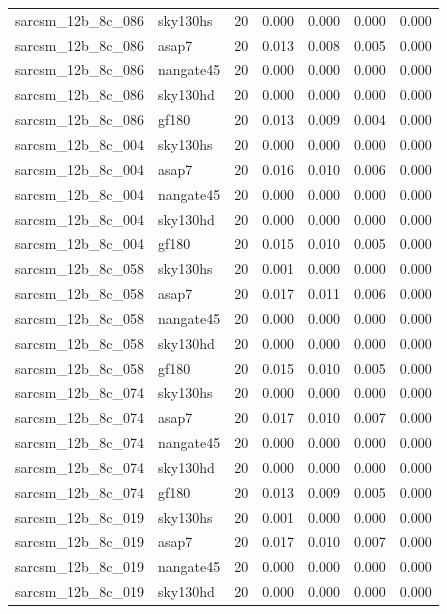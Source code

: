 \begin{tabular}{llrrrrr}
sarcsm\_12b\_8c\_086 & sky130hs & 20 & 0.000 & 0.000 & 0.000 & 0.000 \\
sarcsm\_12b\_8c\_086 & asap7 & 20 & 0.013 & 0.008 & 0.005 & 0.000 \\
sarcsm\_12b\_8c\_086 & nangate45 & 20 & 0.000 & 0.000 & 0.000 & 0.000 \\
sarcsm\_12b\_8c\_086 & sky130hd & 20 & 0.000 & 0.000 & 0.000 & 0.000 \\
sarcsm\_12b\_8c\_086 & gf180 & 20 & 0.013 & 0.009 & 0.004 & 0.000 \\
sarcsm\_12b\_8c\_004 & sky130hs & 20 & 0.000 & 0.000 & 0.000 & 0.000 \\
sarcsm\_12b\_8c\_004 & asap7 & 20 & 0.016 & 0.010 & 0.006 & 0.000 \\
sarcsm\_12b\_8c\_004 & nangate45 & 20 & 0.000 & 0.000 & 0.000 & 0.000 \\
sarcsm\_12b\_8c\_004 & sky130hd & 20 & 0.000 & 0.000 & 0.000 & 0.000 \\
sarcsm\_12b\_8c\_004 & gf180 & 20 & 0.015 & 0.010 & 0.005 & 0.000 \\
sarcsm\_12b\_8c\_058 & sky130hs & 20 & 0.001 & 0.000 & 0.000 & 0.000 \\
sarcsm\_12b\_8c\_058 & asap7 & 20 & 0.017 & 0.011 & 0.006 & 0.000 \\
sarcsm\_12b\_8c\_058 & nangate45 & 20 & 0.000 & 0.000 & 0.000 & 0.000 \\
sarcsm\_12b\_8c\_058 & sky130hd & 20 & 0.000 & 0.000 & 0.000 & 0.000 \\
sarcsm\_12b\_8c\_058 & gf180 & 20 & 0.015 & 0.010 & 0.005 & 0.000 \\
sarcsm\_12b\_8c\_074 & sky130hs & 20 & 0.000 & 0.000 & 0.000 & 0.000 \\
sarcsm\_12b\_8c\_074 & asap7 & 20 & 0.017 & 0.010 & 0.007 & 0.000 \\
sarcsm\_12b\_8c\_074 & nangate45 & 20 & 0.000 & 0.000 & 0.000 & 0.000 \\
sarcsm\_12b\_8c\_074 & sky130hd & 20 & 0.000 & 0.000 & 0.000 & 0.000 \\
sarcsm\_12b\_8c\_074 & gf180 & 20 & 0.013 & 0.009 & 0.005 & 0.000 \\
sarcsm\_12b\_8c\_019 & sky130hs & 20 & 0.001 & 0.000 & 0.000 & 0.000 \\
sarcsm\_12b\_8c\_019 & asap7 & 20 & 0.017 & 0.010 & 0.007 & 0.000 \\
sarcsm\_12b\_8c\_019 & nangate45 & 20 & 0.000 & 0.000 & 0.000 & 0.000 \\
sarcsm\_12b\_8c\_019 & sky130hd & 20 & 0.000 & 0.000 & 0.000 & 0.000 \\

\end{tabular}
